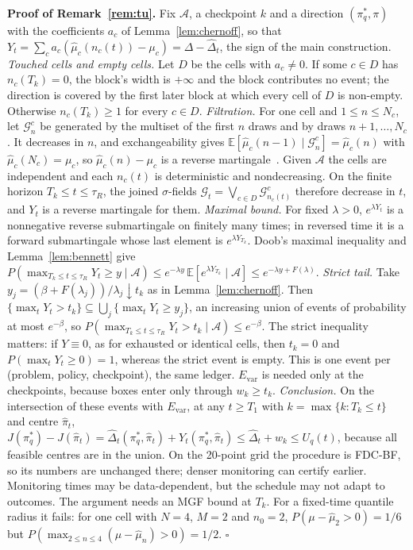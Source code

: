 \documentclass[sigconf,anonymous,review]{acmart}
\newcommand{\cA}{\mathcal{A}}
\begin{document}
\textbf{Proof of Remark~\ref{rem:tu}.} Fix $\cA$, a checkpoint $k$ and a direction $(\pi^*_q, \pi)$ with the coefficients $a_c$ of Lemma~\ref{lem:chernoff}, so that $Y_t = \sum_c a_c(\hat\mu_c(n_c(t)) - \mu_c) = \Delta - \hat\Delta_t$, the sign of the main construction. \emph{Touched cells and empty cells.} Let $D$ be the cells with $a_c \neq 0$. If some $c \in D$ has $n_c(T_k) = 0$, the block's width is $+\infty$ and the block contributes no event; the direction is covered by the first later block at which every cell of $D$ is non-empty. Otherwise $n_c(T_k) \ge 1$ for every $c \in D$. \emph{Filtration.} For one cell and $1 \le n \le N_c$, let $\mathcal{G}^c_n$ be generated by the multiset of the first $n$ draws and by draws $n+1, \dots, N_c$. It decreases in $n$, and exchangeability gives $\mathbb{E}[\hat\mu_c(n-1) \mid \mathcal{G}^c_n] = \hat\mu_c(n)$ with $\hat\mu_c(N_c) = \mu_c$, so $\hat\mu_c(n) - \mu_c$ is a reverse martingale~\citep{serfling1974probability,bardenet2015concentration}. Given $\cA$ the cells are independent and each $n_c(t)$ is deterministic and nondecreasing. On the finite horizon $T_k \le t \le \tau_R$, the joined $\sigma$-fields $\mathcal{G}_t = \bigvee_{c \in D} \mathcal{G}^c_{n_c(t)}$ therefore decrease in $t$, and $Y_t$ is a reverse martingale for them. \emph{Maximal bound.} For fixed $\lambda > 0$, $e^{\lambda Y_t}$ is a nonnegative reverse submartingale on finitely many times; in reversed time it is a forward submartingale whose last element is $e^{\lambda Y_{T_k}}$. Doob's maximal inequality and Lemma~\ref{lem:bennett} give $P(\max_{T_k \le t \le \tau_R} Y_t \ge y \mid \cA) \le e^{-\lambda y}\,\mathbb{E}[e^{\lambda Y_{T_k}} \mid \cA] \le e^{-\lambda y + F(\lambda)}$. \emph{Strict tail.} Take $y_j = (\beta + F(\lambda_j))/\lambda_j \downarrow t_k$ as in Lemma~\ref{lem:chernoff}. Then $\{\max_t Y_t > t_k\} \subseteq \bigcup_j \{\max_t Y_t \ge y_j\}$, an increasing union of events of probability at most $e^{-\beta}$, so $P(\max_{T_k \le t \le \tau_R} Y_t > t_k \mid \cA) \le e^{-\beta}$. The strict inequality matters: if $Y \equiv 0$, as for exhausted or identical cells, then $t_k = 0$ and $P(\max_t Y_t \ge 0) = 1$, whereas the strict event is empty. This is one event per (problem, policy, checkpoint), the same ledger. $E_{\text{var}}$ is needed only at the checkpoints, because boxes enter only through $w_k \ge t_k$. \emph{Conclusion.} On the intersection of these events with $E_{\text{var}}$, at any $t \ge T_1$ with $k = \max\{k : T_k \le t\}$ and centre $\hat\pi_t$, $J(\pi^*_q) - J(\hat\pi_t) = \hat\Delta_t(\pi^*_q, \hat\pi_t) + Y_t(\pi^*_q, \hat\pi_t) \le \hat\Delta_t + w_k \le U_q(t)$, because all feasible centres are in the union. On the 20-point grid the procedure is FDC-BF, so its numbers are unchanged there; denser monitoring can certify earlier. Monitoring times may be data-dependent, but the schedule may not adapt to outcomes. The argument needs an MGF bound at $T_k$. For a fixed-time quantile radius it fails: for one cell with $N = 4$, $M = 2$ and $n_0 = 2$, $P(\mu - \hat\mu_2 > 0) = 1/6$ but $P(\max_{2 \le n \le 4} (\mu - \hat\mu_n) > 0) = 1/2$. $\square$
\end{document}
